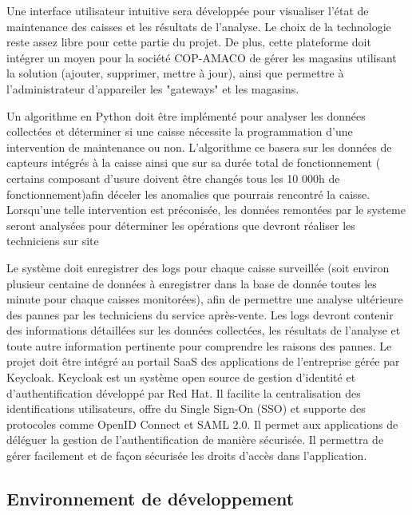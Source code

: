 \documentclass[12pt]{article}
\begin{document}
\justify
\text Une interface utilisateur intuitive sera développée pour visualiser l'état de maintenance des caisses et les résultats de l'analyse. Le choix de la technologie reste assez libre pour cette partie du projet.
De plus, cette plateforme doit intégrer un moyen pour la société COP-AMACO de gérer les magasins utilisant la solution (ajouter, supprimer, mettre à jour), ainsi que permettre à l'administrateur d'appareiler les "gateways" et les magasins.

\justify
\text Un algorithme en Python doit être implémenté pour analyser les données collectées et déterminer si une caisse nécessite la programmation d'une intervention de maintenance ou non. L'algorithme ce basera sur les données de capteurs intégrés à la  caisse ainsi que sur sa durée total de fonctionnement ( certains composant d'usure doivent être changés tous les 10 000h  de fonctionnement)afin déceler les anomalies que pourrais rencontré la caisse. Lorsqu'une telle intervention est préconisée, les données remontées par le systeme seront analysées pour déterminer les opérations que devront réaliser les techniciens sur site

\justify
\text Le système doit enregistrer des logs pour chaque caisse surveillée (soit environ plusieur centaine  de données à enregistrer dans la base de donnée toutes les minute pour chaque caisses monitorées), afin de permettre une analyse ultérieure des pannes par les techniciens du service après-vente. Les logs devront contenir des informations détaillées sur les données collectées, les résultats de l'analyse et toute autre information pertinente pour comprendre les raisons des pannes.
\justify
\text Le projet doit être intégré au portail SaaS des applications de l'entreprise gérée par Keycloak. Keycloak est un système open source de gestion d'identité et d'authentification développé par Red Hat. Il facilite la centralisation des identifications utilisateurs, offre du Single Sign-On (SSO) et supporte des protocoles comme OpenID Connect et SAML 2.0. Il permet aux applications de déléguer la gestion de l'authentification de manière sécurisée. Il permettra de gérer facilement et de façon sécurisée les droits d'accès dans l'application.

\subsection{Environnement de développement} 
\end{document}

